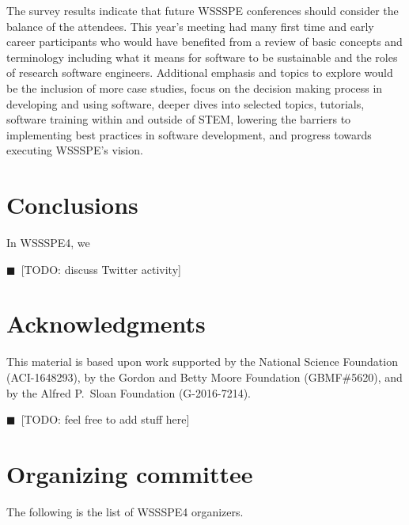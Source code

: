 \documentclass[11pt, oneside]{amsart}
\newcommand{\todo}[1]{{\color{blue}$\blacksquare$~\textsf{[TODO: #1]}}}
\begin{document}
The survey results indicate that future WSSSPE conferences should consider the balance of the attendees.
This year's meeting had many first time and early career participants who would have benefited from a review of basic concepts and terminology including what it means for software to be sustainable and the roles of research software engineers.
Additional emphasis and topics to explore would be the inclusion of more case studies, focus on the decision making process in developing and using software, deeper dives into selected topics, tutorials, software training within and outside of STEM, lowering the barriers to implementing best practices in software development, and progress towards executing WSSSPE's vision.

\section{Conclusions} \label{sec:conclusions}

In WSSSPE4, we

\todo{discuss Twitter activity}


\section*{Acknowledgments} \label{sec:acks}

This material is based upon work supported by the National Science Foundation (ACI-1648293),
by the Gordon and Betty Moore Foundation (GBMF\#5620),
and by the Alfred P.~Sloan Foundation (G-2016-7214).

\todo{feel free to add stuff here}

\newpage
\appendix
\section{Organizing committee}  \label{sec:orgcom}

The following is the list of WSSSPE4 organizers.

{\scriptsize
\begin{longtable}{lll}

\end{longtable}
}
\end{document}
